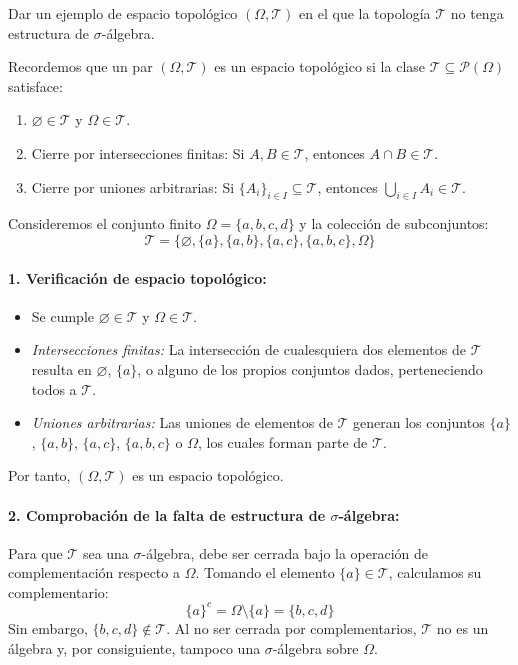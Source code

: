 \newpage
\begin{problema}
Dar un ejemplo de espacio topológico $(\Omega, \mathcal{T})$ en el que la topología $\mathcal{T}$ no tenga estructura de $\sigma$-álgebra.

\tcblower

Recordemos que un par $(\Omega, \mathcal{T})$ es un espacio topológico si la clase $\mathcal{T} \subseteq \mathcal{P}(\Omega)$ satisface:
\begin{enumerate}[label=\alph*)]
    \item $\varnothing \in \mathcal{T}$ y $\Omega \in \mathcal{T}$.
    \item Cierre por intersecciones finitas: Si $A, B \in \mathcal{T}$, entonces $A \cap B \in \mathcal{T}$.
    \item Cierre por uniones arbitrarias: Si $\{A_i\}_{i \in I} \subseteq \mathcal{T}$, entonces $\bigcup_{i \in I} A_i \in \mathcal{T}$.
\end{enumerate}

Consideremos el conjunto finito $\Omega = \{a, b, c, d\}$ y la colección de subconjuntos:
\[
    \mathcal{T} = \bigl\{ \varnothing, \{a\}, \{a,b\}, \{a,c\}, \{a,b,c\}, \Omega \bigr\}
\]

\paragraph{1. Verificación de espacio topológico:}
\begin{itemize}
    \item Se cumple $\varnothing \in \mathcal{T}$ y $\Omega \in \mathcal{T}$.
    \item \textit{Intersecciones finitas:} La intersección de cualesquiera dos elementos de $\mathcal{T}$ resulta en $\varnothing$, $\{a\}$, o alguno de los propios conjuntos dados, perteneciendo todos a $\mathcal{T}$.
    \item \textit{Uniones arbitrarias:} Las uniones de elementos de $\mathcal{T}$ generan los conjuntos $\{a\}$, $\{a,b\}$, $\{a,c\}$, $\{a,b,c\}$ o $\Omega$, los cuales forman parte de $\mathcal{T}$.
\end{itemize}
Por tanto, $(\Omega, \mathcal{T})$ es un espacio topológico.

\paragraph{2. Comprobación de la falta de estructura de $\sigma$-álgebra:}
Para que $\mathcal{T}$ sea una $\sigma$-álgebra, debe ser cerrada bajo la operación de complementación respecto a $\Omega$. Tomando el elemento $\{a\} \in \mathcal{T}$, calculamos su complementario:
\[
    \{a\}^c = \Omega \setminus \{a\} = \{b, c, d\}
\]
Sin embargo, $\{b, c, d\} \notin \mathcal{T}$. Al no ser cerrada por complementarios, $\mathcal{T}$ no es un álgebra y, por consiguiente, tampoco una $\sigma$-álgebra sobre $\Omega$.
\end{problema}
